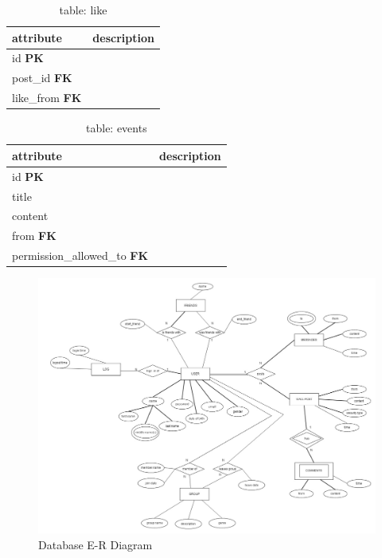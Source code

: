 \begin{table}[h]
    \centering
    \begin{tabular}{ll}
    attribute              & description\\ \hline
    id \textbf{PK}         & \\
    post\_id \textbf{FK}   & \\
    like\_from \textbf{FK} & \\
    \end{tabular}
    \caption{table: like}
\end{table}

\begin{table}[h]
    \centering
    \begin{tabular}{ll}
    attribute                           & description\\ \hline
    id \textbf{PK}                      & \\
    title                               & \\
    content                             & \\ 
    from \textbf{FK}                    & \\
    permission\_allowed\_to \textbf{FK} & \\
    \end{tabular}
    \caption{table: events}
\end{table}

\begin{figure}[h]
    \centering
    \includegraphics[width=\textwidth]{images/design/er_diagram.jpg}
    \caption{Database E-R Diagram}
    \label{fig:db_er_diag}
\end{figure}

